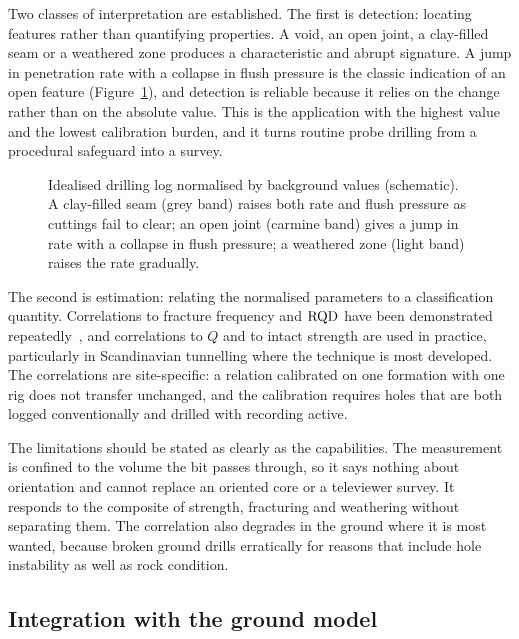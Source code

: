 Two classes of interpretation are established. The first is detection:
locating features rather than quantifying properties. A void, an open joint, a
clay-filled seam or a weathered zone produces a characteristic and abrupt
signature. A jump in penetration rate with a collapse in flush pressure is
the classic indication of an open feature (Figure~\ref{fig:mwd-open-feature}),
and detection is reliable because
it relies on the change rather than on the absolute value. This is the
application with the highest value and the lowest calibration burden, and it
turns routine probe drilling from a procedural safeguard into a survey.

\begin{figure}[htbp]
\centering
{}
\caption{Idealised drilling log normalised by background values (schematic). A clay-filled seam (grey band) raises both rate and flush pressure as cuttings fail to clear; an open joint (carmine band) gives a jump in rate with a collapse in flush pressure; a weathered zone (light band) raises the rate gradually.}
\label{fig:mwd-open-feature}
\end{figure}

The second is estimation: relating the normalised parameters to a
classification quantity. Correlations to fracture frequency and $\mathrm{RQD}$ have
been demonstrated repeatedly~\citep{schunnesson1996rqd}, and correlations to
$Q$ and to intact strength are used in practice, particularly in Scandinavian
tunnelling where the technique is most developed. The correlations
are site-specific: a relation calibrated on one
formation with one rig does not transfer unchanged, and the calibration
requires holes that are both logged conventionally and drilled with recording
active.

The limitations should be stated as clearly as the capabilities. The
measurement is confined to the volume the bit passes through, so it says
nothing about orientation and cannot replace an oriented core or a televiewer
survey. It responds to the composite of strength, fracturing and weathering
without separating them. The correlation also degrades in the ground
where it is most wanted, because broken ground drills erratically for reasons
that include hole instability as well as rock condition.

\subsection{Integration with the ground model}
\label{sec:mwd-integration}

